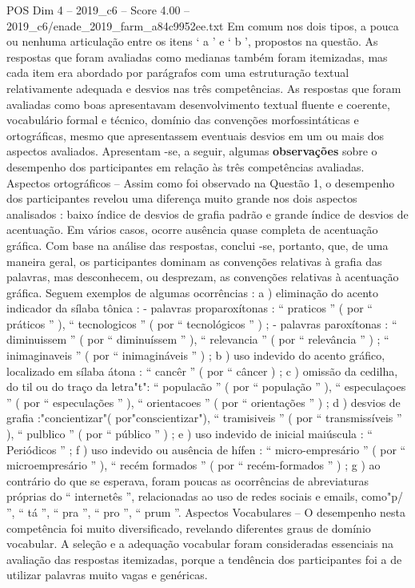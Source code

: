 \begin{textsample}{POS Dim 4 – 2019\_c6 – Score 4.00 – 2019\_c6/enade\_2019\_farm\_a84c9952ee.txt}
Em comum nos dois tipos, a pouca ou nenhuma articulação entre os itens ‘ a ’ e ‘ b ’, propostos na questão.
As respostas que foram avaliadas como medianas também foram itemizadas, mas cada item era abordado por parágrafos com uma estruturação textual relativamente adequada e desvios nas três competências.
As respostas que foram avaliadas como boas apresentavam desenvolvimento textual fluente e coerente, vocabulário formal e técnico, domínio das convenções morfossintáticas e ortográficas, mesmo que apresentassem eventuais desvios em um ou mais dos aspectos avaliados.
Apresentam -se, a seguir, algumas \textbf{observações} sobre o desempenho dos participantes em relação às três competências avaliadas.
Aspectos ortográficos – Assim como foi observado na Questão 1, o desempenho dos participantes revelou uma diferença muito grande nos dois aspectos analisados : baixo índice de desvios de grafia padrão e grande índice de desvios de acentuação.
Em vários casos, ocorre ausência quase completa de acentuação gráfica.
Com base na análise das respostas, conclui -se, portanto, que, de uma maneira geral, os participantes dominam as convenções relativas à grafia das palavras, mas desconhecem, ou desprezam, as convenções relativas à acentuação gráfica.
Seguem exemplos de algumas ocorrências : a ) eliminação do acento indicador da sílaba tônica : - palavras proparoxítonas : “ praticos ” ( por “ práticos ” ), “ tecnologicos ” ( por “ tecnológicos ” ) ; - palavras paroxítonas : “ diminuissem ” ( por “ diminuíssem ” ), “ relevancia ” ( por “ relevância ” ) ; “ inimaginaveis ” ( por “ inimagináveis ” ) ; b ) uso indevido do acento gráfico, localizado em sílaba átona : “ cancêr ” ( por “ câncer ) ; c ) omissão da cedilha, do til ou do traço da letra"t": “ populacão ” ( por “ população ” ), “ especulaçoes ” ( por “ especulações ” ), “ orientacoes ” ( por “ orientações ” ) ; d ) desvios de grafia :"concientizar"( por"conscientizar"), “ tramisiveis ” ( por “ transmissíveis ” ), “ pulblico ” ( por “ público ” ) ; e ) uso indevido de inicial maiúscula : “ Periódicos ” ; f ) uso indevido ou ausência de hífen : “ micro-empresário ” ( por “ microempresário ” ), “ recém formados ” ( por “ recém-formados ” ) ; g ) ao contrário do que se esperava, foram poucas as ocorrências de abreviaturas próprias do “ internetês ”, relacionadas ao uso de redes sociais e emails, como"p/ ”, “ tá ”, “ pra ”, “ pro ”, “ prum ”.
Aspectos Vocabulares – O desempenho nesta competência foi muito diversificado, revelando diferentes graus de domínio vocabular.
A seleção e a adequação vocabular foram consideradas essenciais na avaliação das respostas itemizadas, porque a tendência dos participantes foi a de utilizar palavras muito vagas e genéricas.

\end{textsample}
